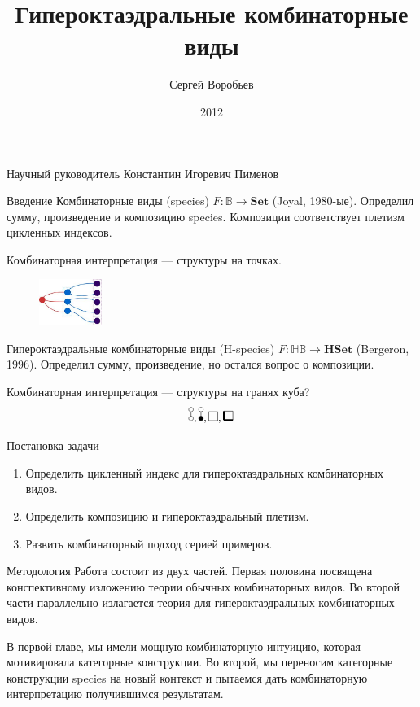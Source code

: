 \documentclass{beamer}
\title{Гипероктаэдральные комбинаторные виды}
\author{Сергей Воробьев}
\institute{Санкт-Петербургский Государственный университет}
\date{2012}
\begin{document}
\begin{frame}
\titlepage
\begin{center}
\begin{small}
Научный руководитель Константин Игоревич Пименов
\end{small}
\end{center}
\end{frame}


\begin{frame}{Введение}
Комбинаторные виды (species) $F\colon \mathbb{B} \rightarrow
\mathbf{Set}$ (Joyal, 1980-ые). Определил сумму, произведение и композицию
species. Композиции соответствует плетизм цикленных
индексов.

Комбинаторная интерпретация --- структуры на точках.
\begin{figure}
   \includegraphics[height=15mm]{species.jpg}
\end{figure}

Гипероктаэдральные комбинаторные виды
(H-species) $F\colon \mathbb{HB} \rightarrow \mathbf{HSet}$ (Bergeron, 1996).
Определил сумму, произведение, но остался вопрос о композиции.

Комбинаторная интерпретация --- структуры на гранях куба?
$$
\dA, \dB, \dAA, \dBB
$$
\end{frame}

\begin{frame}{Постановка задачи}
\begin{enumerate}[*]
\item Определить цикленный индекс для гипероктаэдральных комбинаторных видов.
\item Определить композицию и гипероктаэдральный плетизм.
\item Развить комбинаторный подход серией примеров.
\end{enumerate}
\end{frame}

\begin{frame}{Методология}
Работа состоит из двух частей. Первая половина посвящена конспективному
изложению теории обычных комбинаторных видов. Во второй части параллельно излагается теория для гипероктаэдральных
комбинаторных видов.

В первой главе, мы имели мощную комбинаторную интуицию, которая
мотивировала категорные конструкции. Во второй, мы переносим категорные
конструкции species на новый контекст и пытаемся дать комбинаторную
интерпретацию получившимся результатам.
\end{frame}
\end{document}
